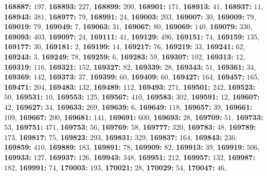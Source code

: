 \textsf{\bfseries 168887:} $197$, \textsf{\bfseries 168893:} $227$, \textsf{\bfseries 168899:} $200$, \textsf{\bfseries 168901:} $171$, \textsf{\bfseries 168913:} $41$, \textsf{\bfseries 168937:} $11$, \textsf{\bfseries 168943:} $381$, \textsf{\bfseries 168977:} $79$, \textsf{\bfseries 168991:} $24$, \textsf{\bfseries 169003:} $203$, \textsf{\bfseries 169007:} $30$, \textsf{\bfseries 169009:} $79$, \textsf{\bfseries 169019:} $79$, \textsf{\bfseries 169049:} $7$, \textsf{\bfseries 169063:} $31$, \textsf{\bfseries 169067:} $80$, \textsf{\bfseries 169069:} $140$, \textsf{\bfseries 169079:} $330$, \textsf{\bfseries 169093:} $403$, \textsf{\bfseries 169097:} $24$, \textsf{\bfseries 169111:} $41$, \textsf{\bfseries 169129:} $496$, \textsf{\bfseries 169151:} $74$, \textsf{\bfseries 169159:} $135$, \textsf{\bfseries 169177:} $30$, \textsf{\bfseries 169181:} $2$, \textsf{\bfseries 169199:} $14$, \textsf{\bfseries 169217:} $76$, \textsf{\bfseries 169219:} $33$, \textsf{\bfseries 169241:} $62$, \textsf{\bfseries 169243:} $3$, \textsf{\bfseries 169249:} $78$, \textsf{\bfseries 169259:} $6$, \textsf{\bfseries 169283:} $59$, \textsf{\bfseries 169307:} $102$, \textsf{\bfseries 169313:} $12$, \textsf{\bfseries 169319:} $116$, \textsf{\bfseries 169321:} $152$, \textsf{\bfseries 169327:} $82$, \textsf{\bfseries 169339:} $28$, \textsf{\bfseries 169343:} $51$, \textsf{\bfseries 169361:} $34$, \textsf{\bfseries 169369:} $142$, \textsf{\bfseries 169373:} $37$, \textsf{\bfseries 169399:} $60$, \textsf{\bfseries 169409:} $60$, \textsf{\bfseries 169427:} $164$, \textsf{\bfseries 169457:} $165$, \textsf{\bfseries 169471:} $204$, \textsf{\bfseries 169483:} $132$, \textsf{\bfseries 169489:} $112$, \textsf{\bfseries 169493:} $271$, \textsf{\bfseries 169501:} $242$, \textsf{\bfseries 169523:} $50$, \textsf{\bfseries 169531:} $10$, \textsf{\bfseries 169553:} $125$, \textsf{\bfseries 169567:} $410$, \textsf{\bfseries 169583:} $302$, \textsf{\bfseries 169591:} $12$, \textsf{\bfseries 169607:} $42$, \textsf{\bfseries 169627:} $34$, \textsf{\bfseries 169633:} $269$, \textsf{\bfseries 169639:} $6$, \textsf{\bfseries 169649:} $118$, \textsf{\bfseries 169657:} $39$, \textsf{\bfseries 169661:} $109$, \textsf{\bfseries 169667:} $200$, \textsf{\bfseries 169681:} $141$, \textsf{\bfseries 169691:} $600$, \textsf{\bfseries 169693:} $28$, \textsf{\bfseries 169709:} $51$, \textsf{\bfseries 169733:} $53$, \textsf{\bfseries 169751:} $471$, \textsf{\bfseries 169753:} $56$, \textsf{\bfseries 169769:} $58$, \textsf{\bfseries 169777:} $320$, \textsf{\bfseries 169783:} $48$, \textsf{\bfseries 169789:} $173$, \textsf{\bfseries 169817:} $75$, \textsf{\bfseries 169823:} $293$, \textsf{\bfseries 169831:} $329$, \textsf{\bfseries 169837:} $164$, \textsf{\bfseries 169843:} $236$, \textsf{\bfseries 169859:} $410$, \textsf{\bfseries 169889:} $183$, \textsf{\bfseries 169891:} $78$, \textsf{\bfseries 169909:} $82$, \textsf{\bfseries 169913:} $39$, \textsf{\bfseries 169919:} $506$, \textsf{\bfseries 169933:} $127$, \textsf{\bfseries 169937:} $126$, \textsf{\bfseries 169943:} $348$, \textsf{\bfseries 169951:} $212$, \textsf{\bfseries 169957:} $132$, \textsf{\bfseries 169987:} $182$, \textsf{\bfseries 169991:} $74$, \textsf{\bfseries 170003:} $193$, \textsf{\bfseries 170021:} $28$, \textsf{\bfseries 170029:} $54$, \textsf{\bfseries 170047:} $46$, 

